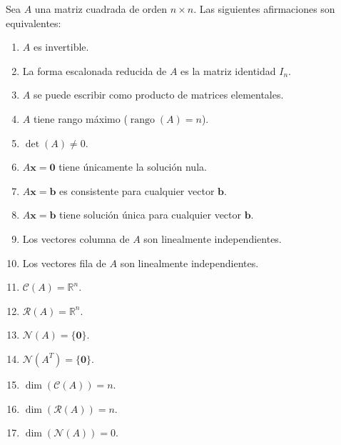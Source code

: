 \begin{theorem}\label{thm:invertible-equiv-v4}
Sea $A$ una matriz cuadrada de orden $n \times n$. Las siguientes afirmaciones son equivalentes:
\begin{enumerate}
    \item $A$ es invertible.
    \item La forma escalonada reducida de $A$ es la matriz identidad $I_n$.
    \item $A$ se puede escribir como producto de matrices elementales.
    \item $A$ tiene rango máximo ($\operatorname{rango}(A) = n$).
    \item $\det(A) \neq 0$.
    \item $A\mathbf{x}=\mathbf{0}$ tiene únicamente la solución nula.
    \item $A\mathbf{x}=\mathbf{b}$ es consistente para cualquier vector $\mathbf{b}$.
    \item $A\mathbf{x}=\mathbf{b}$ tiene solución única para cualquier vector $\mathbf{b}$.
    \item Los vectores columna de $A$ son linealmente independientes.
    \item Los vectores fila de $A$ son linealmente independientes.
    \item $\mathcal{C}(A) = \mathbb{R}^n$.
    \item $\mathcal{R}(A) = \mathbb{R}^n$.
    \item $\mathcal{N}(A) = \{\mathbf{0}\}$.
    \item $\mathcal{N}(A^T) = \{\mathbf{0}\}$.
    \item $\dim(\mathcal{C}(A)) = n$.
    \item $\dim(\mathcal{R}(A)) = n$.
    \item $\dim(\mathcal{N}(A)) = 0$.
\end{enumerate}
\end{theorem}

